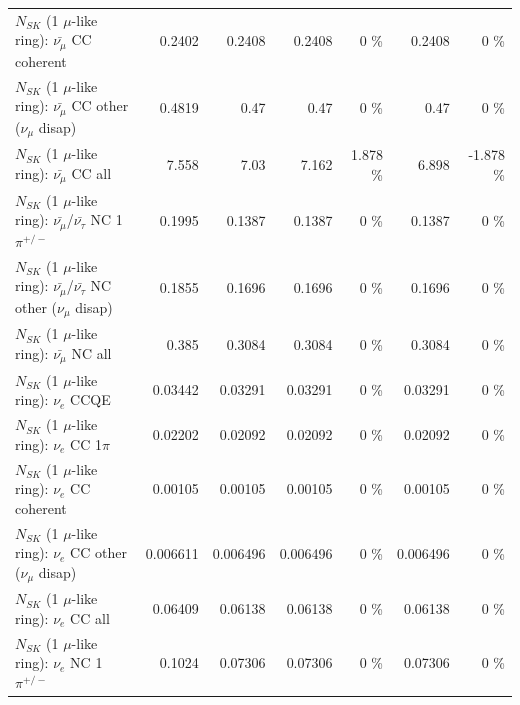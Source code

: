 \begin{table}
\begin{tabular}{| l | r | r | r  r | r  r |}
                       $N_{SK}$ (1 $\mu$-like ring): $\bar{\nu_\mu}$ CC coherent &          0.2402 &          0.2408 &          0.2408 &        0 \%  &          0.2408 &        0 \%  \\ 
        $N_{SK}$ (1 $\mu$-like ring): $\bar{\nu_\mu}$ CC other ($\nu_\mu$ disap) &          0.4819 &            0.47 &            0.47 &        0 \%  &            0.47 &        0 \%  \\ 
                          $N_{SK}$ (1 $\mu$-like ring): $\bar{\nu_{\mu}}$ CC all &           7.558 &            7.03 &           7.162 &    1.878 \%  &           6.898 &   -1.878 \%  \\ 
\hline
  $N_{SK}$ (1 $\mu$-like ring): $\bar{\nu_\mu}$/$\bar{\nu_\tau}$ NC 1$\pi^{+/-}$ &          0.1995 &          0.1387 &          0.1387 &        0 \%  &          0.1387 &        0 \%  \\ 
$N_{SK}$ (1 $\mu$-like ring): $\bar{\nu_\mu}$/$\bar{\nu_\tau}$ NC other ($\nu_\mu$ disap) &          0.1855 &          0.1696 &          0.1696 &        0 \%  &          0.1696 &        0 \%  \\ 
                          $N_{SK}$ (1 $\mu$-like ring): $\bar{\nu_{\mu}}$ NC all &           0.385 &          0.3084 &          0.3084 &        0 \%  &          0.3084 &        0 \%  \\ 
\hline
\hline
\hline
                                      $N_{SK}$ (1 $\mu$-like ring): $\nu_e$ CCQE &         0.03442 &         0.03291 &         0.03291 &        0 \%  &         0.03291 &        0 \%  \\ 
                                 $N_{SK}$ (1 $\mu$-like ring): $\nu_e$ CC 1$\pi$ &         0.02202 &         0.02092 &         0.02092 &        0 \%  &         0.02092 &        0 \%  \\ 
                               $N_{SK}$ (1 $\mu$-like ring): $\nu_e$ CC coherent &         0.00105 &         0.00105 &         0.00105 &        0 \%  &         0.00105 &        0 \%  \\ 
                $N_{SK}$ (1 $\mu$-like ring): $\nu_e$ CC other ($\nu_\mu$ disap) &        0.006611 &        0.006496 &        0.006496 &        0 \%  &        0.006496 &        0 \%  \\ 
                                  $N_{SK}$ (1 $\mu$-like ring): $\nu_{e}$ CC all &         0.06409 &         0.06138 &         0.06138 &        0 \%  &         0.06138 &        0 \%  \\ 
\hline
                           $N_{SK}$ (1 $\mu$-like ring): $\nu_e$ NC 1$\pi^{+/-}$ &          0.1024 &         0.07306 &         0.07306 &        0 \%  &         0.07306 &        0 \%  \\ 

\end{tabular}
\end{table}
